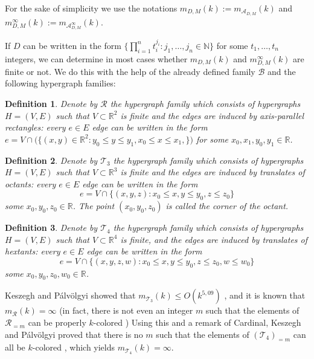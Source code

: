 \documentclass[11pt,oneside]{amsart}
\newcommand{\R}{\mathbb{R}}
\newcommand{\RR}{\mathcal{R}}
\newtheorem{definition}{Definition}
\begin{document}
For the sake of simplicity we use the notations
$m_{D,M}(k):=m_{\mathcal{A}_{D,M}}(k)$ and
$m_{D,M}^\infty(k):=m_{\mathcal{A}_{D,M}^{\infty}}(k)$. 



If $D$ can be written in the form $\{\prod_{i=1}^n t_i^{j_i}: j_1,\ldots,j_n\in \mathbb{N}\}$ for some $t_1,\ldots,t_n$ integers, we can determine in most cases whether $m_{D,M}(k)$ and $m_{D,M}^\infty(k)$ are finite or not. We do this with the help of the already defined family $\mathcal{B}$ and the following hypergraph families:


\begin{definition} Denote by $\RR$ the hypergraph family which consists of hypergraphs $H=(V,E)$ such that $V\subset \R^2$ is finite and the edges are induced by axis-parallel rectangles: every $e\in E$ edge can be written in the form $e=V\cap\big(\{(x,y)\in\R^2: y_0\le y \le y_1, x_0\le x\le x_1, \}\big)$ for some $x_0,x_1,y_0,y_1\in\R$. 
\end{definition}



\begin{definition} 
Denote by $\mathcal{T}_3$ the hypergraph family which consists of hypergraphs $H =(V,E)$ such that $V \subset \mathbb{R}^3$ is finite and the edges are induced by translates of octants: every $e\in E$ edge can be written in the form
\[
e = V \cap \{(x,y,z):x_0 \le x,y\le y_0, z\le z_0\}
\]
some $x_0,y_0,z_0 \in \mathbb{R}$. The point $(x_0,y_0,z_0)$ is called the corner of the octant.
\end{definition}

\begin{definition} 
Denote by $\mathcal{T}_4$ the hypergraph family which consists of hypergraphs $H =(V,E)$ such that $V \subset \mathbb{R}^4$ is finite, and the edges are induced by translates of hextants: every $e\in E$ edge can be written in the form
\[
e = V \cap \{(x,y,z,w):x_0 \le x,y\le y_0, z\le z_0, w\le w_0\}
\]
some $x_0,y_0,z_0,w_0 \in \mathbb{R}$.
\end{definition}

Keszegh and Pálvölgyi showed that $m_{\mathcal{T}_3}(k)\le O(k^{5,09})$ \cite{ternyolcad}, and it is known that $m_\RR(k)=\infty$ (in fact, there is not even an integer $m$ such that the elements of $\RR_{=m}$ can be properly $k$-colored \cite[Theorem 3.]{teglalap})
Using this and a remark of Cardinal, Keszegh and Pálvölgyi proved that there is no $m$ such that the elements of $(\mathcal{T}_4)_{=m}$ can all be $k$-colored \cite[Theorem 12.]{hextant}, which yields $m_{\mathcal{T}_4}(k)=\infty$.
\end{document}
